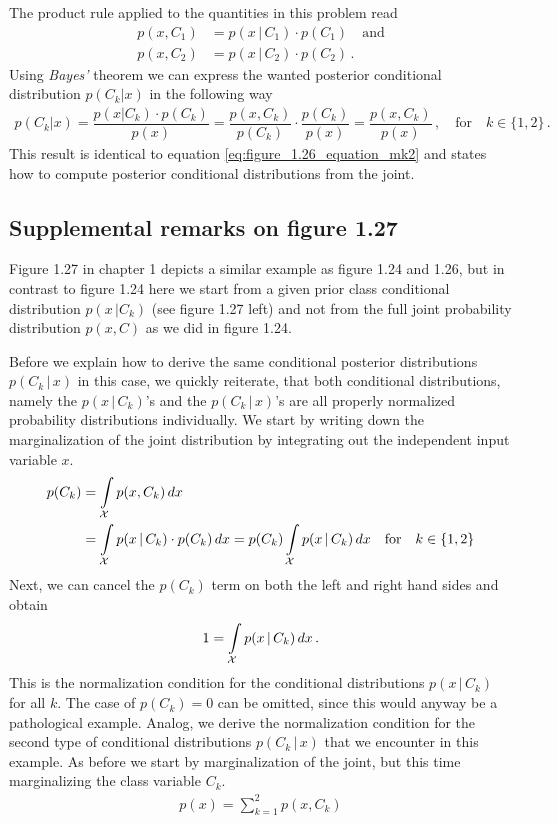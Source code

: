 \documentclass[11pt, DINA4, fleqn]{amsart}
\begin{document}
The product rule applied to the quantities in this problem read
\begin{align}
p(x, C_1) &= p(x\, | \, C_1) \cdot p(C_1) \quad \text{and} \\
p(x, C_2) &= p(x\, | \, C_2) \cdot p(C_2) \, .
\end{align}
Using \emph{Bayes'} theorem we can express the wanted posterior conditional distribution $p(C_k | x)$ in the following way
\begin{align}
p(C_k | x) = \dfrac{p(x | C_k) \cdot p(C_k)}{p(x)} = \dfrac{p(x, C_k)}{p(C_k)} \cdot \dfrac{p(C_k)}{p(x)} = \dfrac{p(x, C_k)}{p(x)} \, , \quad \text{for} \quad k\in\{1,2\} \, .
\end{align}
This result is identical to equation \eqref{eq:figure_1.26_equation_mk2} and states how to compute posterior conditional distributions from the joint.

\subsection{Supplemental remarks on figure 1.27}
Figure 1.27 in chapter 1 depicts a similar example as figure 1.24 and 1.26, but in contrast to figure 1.24 here we start from a given prior class conditional distribution $p(x \, | C_k)$ (see figure 1.27 left) and not from the full joint probability distribution $p(x, C)$ as we did in figure 1.24.

Before we explain how to derive the same conditional posterior distributions $p(C_k \, | \, x)$ in this case, we quickly reiterate, that both conditional distributions, namely the $p(x \, | \, C_k)$'s and the $p(C_k \, | \, x)$'s are all properly normalized probability distributions individually.
We start by writing down the marginalization of the joint distribution by integrating out the independent input variable $x$.
\begin{align}
p(C_k) &= \int\displaylimits_{\mathcal{X}} p(x, C_k) \, dx \\
&= \int\displaylimits_{\mathcal{X}} p(x \, | \, C_k) \cdot p(C_k) \, dx
= p(C_k) \int\displaylimits_{\mathcal{X}} p(x \, | \, C_k) \, dx \quad \text{for} \quad k\in\{1, 2\}
\end{align}
Next, we can cancel the $p(C_k)$ term on both the left and right hand sides and obtain
\begin{align}
1 = \int\displaylimits_{\mathcal{X}} p(x \, | \, C_k) \, dx \, .
\end{align}
This is the normalization condition for the conditional distributions $p(x \, | \, C_k)$ for all $k$.
The case of $p(C_k) = 0$ can be omitted, since this would anyway be a pathological example.
Analog, we derive the normalization condition for the second type of conditional distributions $p(C_k \, | \, x)$ that we encounter in this example. As before we start by marginalization of the joint, but this time marginalizing the class variable $C_k$.
\begin{align}
p(x) = \sum_{k = 1}^{2} p(x, C_k)
\end{align}
\end{document}
